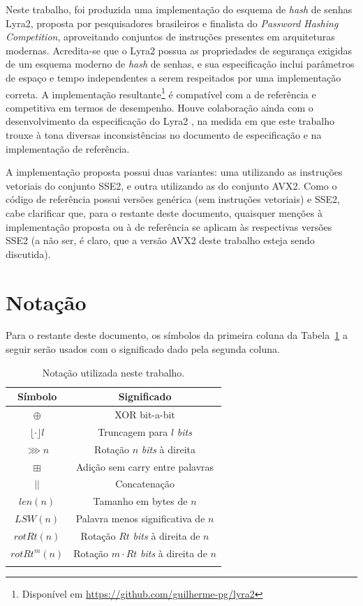 \documentclass{article}
\begin{document}
Neste trabalho, foi produzida uma implementação do
esquema de \emph{hash} de senhas Lyra2, proposta por pesquisadores
brasileiros e finalista do \emph{Password Hashing Competition}, aproveitando
conjuntos de instruções presentes em arquiteturas modernas. Acredita-se
que o Lyra2 possua as propriedades de segurança exigidas de um esquema moderno
de \emph{hash} de senhas, e sua especificação inclui parâmetros de espaço e tempo
independentes a serem respeitados por uma implementação correta.
A implementação resultante\footnote{Disponível em \url{https://github.com/guilherme-pg/lyra2}}
é compatível com a de referência e competitiva em termos de desempenho. Houve colaboração
ainda com o desenvolvimento da especificação do Lyra2 \cite{lyra2-spec},
na medida em que este trabalho trouxe à tona diversas
inconsistências no documento de especificação e na implementação de referência.

A implementação proposta possui duas variantes: uma utilizando as instruções
vetoriais do conjunto SSE2, e outra utilizando as do conjunto AVX2. Como o
código de referência possui versões genérica (sem instruções vetoriais) e SSE2,
cabe clarificar que, para o restante deste documento, quaisquer menções à
implementação proposta ou à de referência se aplicam às respectivas versões
SSE2 (a não ser, é claro, que a versão AVX2 deste trabalho esteja sendo
discutida).

\section{Notação}

Para o restante deste documento, os símbolos da primeira coluna da
Tabela~\ref{tb:notation} a seguir serão usados com o significado dado pela segunda coluna.

\begingroup
\small
\begin{longtable}[c]{@{}cc@{}}
\toprule
Símbolo & Significado\tabularnewline
\midrule
\endhead
$\oplus$ & XOR bit-a-bit\tabularnewline
$\lfloor \cdot \rfloor l$ & Truncagem para $l$ \emph{bits}\tabularnewline
$\ggg n$ & Rotação $n$ \emph{bits} à direita\tabularnewline
$\boxplus$ & Adição sem carry entre palavras\tabularnewline
$||$ & Concatenação\tabularnewline
$len(n)$ & Tamanho em bytes de $n$\tabularnewline
$LSW(n)$ & Palavra menos significativa de $n$\tabularnewline
$rotRt(n)$ & Rotação $Rt$ \emph{bits} à direita de $n$\tabularnewline
$rotRt^{m}(n)$ & Rotação $m \cdot Rt$ \emph{bits} à direita de
$n$\tabularnewline
\bottomrule
\caption{\label{tb:notation} Notação utilizada neste trabalho.}
\end{longtable}
\vspace{-1cm}
\endgroup
\end{document}
